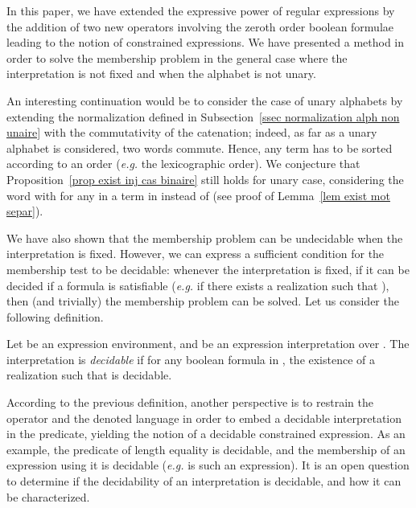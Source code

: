 \documentclass[a4paper]{llncs}
\begin{document}
  In this paper, we have extended the expressive power of regular expressions by the addition of two new operators involving the zeroth order boolean formulae leading to the notion of constrained expressions. We have presented a method in order to solve the membership problem in the general case where the interpretation is not fixed and when the alphabet is not unary.
  
  An interesting continuation would be to consider the case of unary alphabets by extending the normalization defined in Subsection~\ref{ssec normalization alph non unaire} with the commutativity of the catenation; indeed, as far as a unary alphabet is considered, two words commute. Hence, any term has to be sorted according to an order (\emph{e.g.} the lexicographic order). We conjecture that Proposition~\ref{prop exist inj cas binaire} still holds for unary case, considering the word  with  for any  in a term in  instead of  (see proof of Lemma~\ref{lem exist mot separ}).
  
   We have also shown that the membership problem can be undecidable when the interpretation is fixed. However, we can express a sufficient condition for the membership test to be decidable: whenever the interpretation  is fixed, if it can be decided if a formula  is satisfiable (\emph{e.g.} if there exists a realization  such that ), then (and trivially) the membership problem can be solved.
   Let us consider the following definition.
   
  \begin{definition}
    Let  be an expression environment, and  be an expression interpretation over .
    The interpretation  is \emph{decidable} if for any boolean formula  in , the existence of a realization  such that  is decidable.
  \end{definition}

  According to the previous definition, another perspective is to restrain the  operator and the denoted language 
  in order to embed a decidable interpretation in the predicate, yielding the notion of a decidable constrained expression.   
   As an example, the predicate of length equality is decidable, and the membership of an expression using it is decidable (\emph{e.g.}  is such an expression).
  It is an open question to determine if the decidability of an interpretation is decidable, and how it can be characterized.
  

\end{document}
